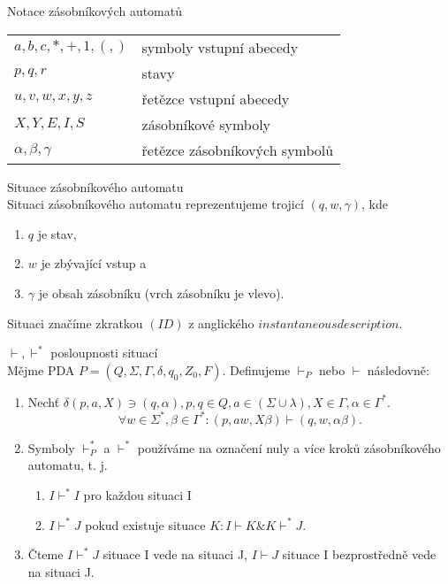 \documentclass[../main.tex]{subfiles}
\begin{document}
    \begin{definition}
        Notace zásobníkových automatů\\

        \begin{tabular}{l l}
            $a,b,c,*,+,1,(,)$ & symboly vstupní abecedy\\
            $p,q,r$ & stavy \\
            $u,v,w,x,y,z$ & řetězce vstupní abecedy\\
            $X,Y,E,I,S$ & zásobníkové symboly\\
            $\alpha, \beta, \gamma$ & řetězce zásobníkových symbolů\\
        \end{tabular}
    \end{definition}

    \begin{definition}
        Situace zásobníkového automatu\\

        Situaci zásobníkového automatu reprezentujeme trojicí $(q,w,\gamma)$, kde
        \begin{enumerate}
            \item $q$ je stav,
            \item $w$ je zbývající vstup a 
            \item $\gamma$ je obsah zásobníku (vrch zásobníku je vlevo).
        \end{enumerate}
        Situaci značíme zkratkou $(ID)$ z anglického $instantaneous description$.
    \end{definition}

    \begin{definition}
        $\vdash, \vdash^*$ posloupnosti situací\\
        
        Mějme PDA $P = (Q,\Sigma, \Gamma, \delta, q_0, Z_0, F)$. Definujeme $\vdash_P$ nebo $\vdash$ následovně:
        \begin{enumerate}
            \item Nechť $\delta(p,a,X) \ni (q,\alpha), p, q \in Q, a \in (\Sigma \cup {\lambda}), X \in \Gamma, \alpha \in \Gamma^*$.
            \[\forall w \in \Sigma^*, \beta \in \Gamma^* : (p,aw, X\beta) \vdash (q,w, \alpha \beta).\]
            \item Symboly $\vdash^*_P$ a $\vdash^*$ používáme na označení nuly a více kroků zásobníkového automatu, t. j.
            \begin{enumerate}
                \item $I \vdash^* I$ pro každou situaci I
                \item $I \vdash^* J$ pokud existuje situace $K : I \vdash K \& K \vdash^* J$.
            \end{enumerate}
            \item Čteme $I \vdash^* J$ situace I vede na situaci J, $I \vdash J$ situace I bezprostředně vede na situaci J.
        \end{enumerate}
    \end{definition}
\end{document}
